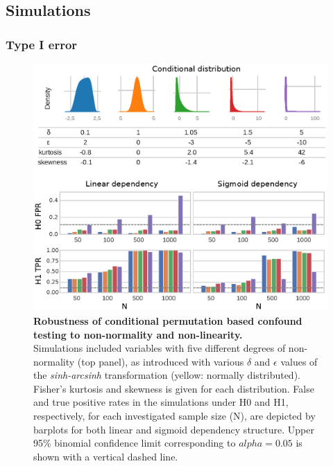 \documentclass{article}
\begin{document}
\subsection{Simulations}

\subsubsection*{Type I error}

\begin{figure}[!b]
  \centering

  \includegraphics[width=0.5\paperwidth]{fig/sim_non-norm.eps}
  \caption{\textbf{Robustness of conditional permutation based confound testing to non-normality and non-linearity.} \\
  Simulations included variables with five different degrees of non-normality (top panel), as introduced with various $\delta$ and $\epsilon$ values of the \emph{sinh-arcsinh} transformation (yellow: normally distributed). Fisher's kurtosis and skewness is given for each distribution. False and true positive rates in the simulations under H0 and H1, respectively, for each investigated sample size (N), are depicted by barplots for both linear and sigmoid dependency structure. Upper 95\% binomial confidence limit corresponding to $alpha=0.05$ is shown with a vertical dashed line.}
  \label{fig:sim-non-normal}
\end{figure}
\end{document}
